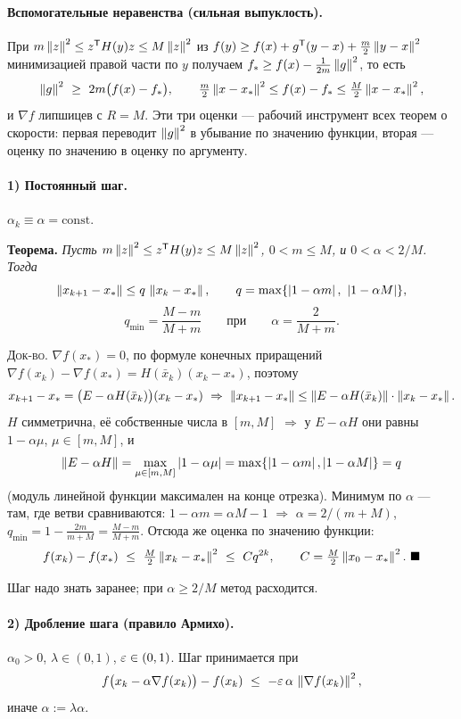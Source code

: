 \paragraph{Вспомогательные неравенства (сильная выпуклость).}
При $m\left\lVert z \right\rVert^2 \le z^{\mathsf{T}} H(y)z \le M\left\lVert z \right\rVert^2$ из
$f(y) \ge f(x) + g^{\mathsf{T}}(y-x) + \tfrac{m}{2}\left\lVert y-x \right\rVert^2$ минимизацией правой
части по $y$ получаем $f_* \ge f(x) - \tfrac{1}{2m}\left\lVert g \right\rVert^2$, то есть
\[
  \left\lVert g \right\rVert^2 \ \ge\ 2m\big(f(x) - f_*\big) ,
  \qquad
  \tfrac{m}{2}\left\lVert x-x_* \right\rVert^2 \le f(x) - f_* \le \tfrac{M}{2}\left\lVert x-x_* \right\rVert^2 ,
\]
и $\nabla f$ липшицев с $R = M$. Эти три оценки — рабочий инструмент всех
теорем о скорости: первая переводит $\left\lVert g \right\rVert^2$ в убывание по значению
функции, вторая — оценку по значению в оценку по аргументу.

\paragraph{1) Постоянный шаг.}
$\alpha_k \equiv \alpha = \mathrm{const}$.

\textbf{Теорема.} \textit{Пусть $m\left\lVert z \right\rVert^2 \le z^{\mathsf{T}} H(y)z \le M\left\lVert z \right\rVert^2$,
$0 < m \le M$, и $0 < \alpha < 2/M$. Тогда}
\[
  \left\lVert x_{k+1} - x_* \right\rVert \le q\,\left\lVert x_k - x_* \right\rVert ,
  \qquad q = \max\{\left\lvert 1-\alpha m \right\rvert,\ \left\lvert 1-\alpha M \right\rvert\} ,
\]
\[
  q_{\min} = \frac{M-m}{M+m}
  \qquad\text{при}\qquad \alpha = \frac{2}{M+m} .
\]

\textsc{Док-во.} $\nabla f(x_*) = 0$, по формуле конечных приращений
$\nabla f(x_k) - \nabla f(x_*) = H(\bar{x}_k)(x_k - x_*)$, поэтому
\[
  x_{k+1} - x_* = \big(E - \alpha H(\bar{x}_k)\big)(x_k - x_*)
  \ \Rightarrow\
  \left\lVert x_{k+1} - x_* \right\rVert \le \left\lVert E - \alpha H(\bar{x}_k) \right\rVert\cdot\left\lVert x_k - x_* \right\rVert .
\]
$H$ симметрична, её собственные числа в $[m,M]$ $\Rightarrow$ у
$E - \alpha H$ они равны $1 - \alpha\mu$, $\mu \in [m,M]$, и
\[
  \left\lVert E - \alpha H \right\rVert = \max_{\mu \in [m,M]}\left\lvert 1-\alpha\mu \right\rvert
   = \max\{\left\lvert 1-\alpha m \right\rvert, \left\lvert 1-\alpha M \right\rvert\} = q
\]
(модуль линейной функции максимален на конце отрезка). Минимум по $\alpha$ —
там, где ветви сравниваются: $1 - \alpha m = \alpha M - 1$ $\Rightarrow$
$\alpha = 2/(m+M)$, $q_{\min} = 1 - \frac{2m}{m+M} = \frac{M-m}{M+m}$.
Отсюда же оценка по значению функции:
\[
  f(x_k) - f(x_*) \ \le\ \tfrac{M}{2}\norm{x_k-x_*}^2 \ \le\ C q^{2k} ,
  \qquad C = \tfrac{M}{2}\norm{x_0 - x_*}^2 . \ \blacksquare
\]

Шаг надо знать заранее; при $\alpha \ge 2/M$ метод расходится.

\paragraph{2) Дробление шага (правило Армихо).}
$\alpha_0 > 0$, $\lambda \in (0,1)$, $\varepsilon \in (0,1)$. Шаг принимается при
\[
  f\big(x_k - \alpha\nabla f(x_k)\big) - f(x_k)
  \ \le\ -\varepsilon\,\alpha\,\left\lVert \nabla f(x_k) \right\rVert^2 ,
\]
иначе $\alpha := \lambda\alpha$.

